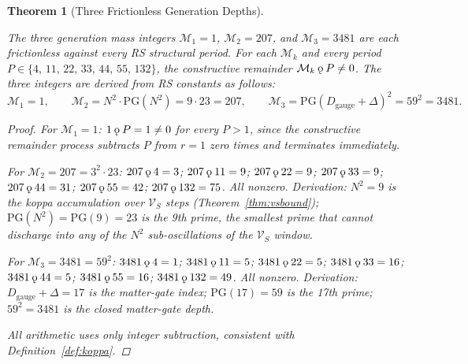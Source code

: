 \documentclass[11pt, letterpaper]{article}
\newcommand{\koppa}{\mathbin{\text{\rm\k{o}}}}
\newcommand{\Dg}{D_{\mathrm{gauge}}}
\newcommand{\VS}{\mathcal{V}_S}
\newcommand{\PG}{\mathrm{PG}}
\theoremstyle{definition}
\theoremstyle{plain}
\newtheorem{theorem}{Theorem}[section]
\begin{document}
\begin{theorem}[Three Frictionless Generation Depths]\label{thm:frictionless}
\begin{rsbox}
The three generation mass integers $\mathcal{M}_1 = 1$, $\mathcal{M}_2 = 207$,
and $\mathcal{M}_3 = 3481$ are each frictionless against every RS structural
period.  For each $\mathcal{M}_k$ and every period $P \in
\{4,\, 11,\, 22,\, 33,\, 44,\, 55,\, 132\}$, the constructive remainder
$\mathcal{M}_k \koppa P \neq 0$.  The three integers are derived from RS
constants as follows:
\[
\mathcal{M}_1 = 1, \qquad
\mathcal{M}_2 = N^2 \cdot \PG(N^2) = 9 \cdot 23 = 207, \qquad
\mathcal{M}_3 = \PG(\Dg + \Delta)^2 = 59^2 = 3481.
\]
\end{rsbox}
\begin{proof}
For $\mathcal{M}_1 = 1$: $1 \koppa P = 1 \neq 0$ for every $P > 1$, since the
constructive remainder process subtracts $P$ from $r = 1$ zero times and
terminates immediately.

For $\mathcal{M}_2 = 207 = 3^2 \cdot 23$: $207 \koppa 4 = 3$; $207 \koppa 11 =
9$; $207 \koppa 22 = 9$; $207 \koppa 33 = 9$; $207 \koppa 44 = 31$;
$207 \koppa 55 = 42$; $207 \koppa 132 = 75$.  All nonzero.  Derivation:
$N^2 = 9$ is the koppa accumulation over $\VS$ steps (Theorem~\ref{thm:vsbound});
$\PG(N^2) = \PG(9) = 23$ is the 9th prime, the smallest prime that cannot
discharge into any of the $N^2$ sub-oscillations of the $\VS$ window.

For $\mathcal{M}_3 = 3481 = 59^2$: $3481 \koppa 4 = 1$; $3481 \koppa 11 = 5$;
$3481 \koppa 22 = 5$; $3481 \koppa 33 = 16$; $3481 \koppa 44 = 5$;
$3481 \koppa 55 = 16$; $3481 \koppa 132 = 49$.  All nonzero.  Derivation:
$\Dg + \Delta = 17$ is the matter-gate index; $\PG(17) = 59$ is the 17th prime;
$59^2 = 3481$ is the closed matter-gate depth.

All arithmetic uses only integer subtraction, consistent with Definition~\ref{def:koppa}.
\end{proof}
\end{theorem}
\end{document}
